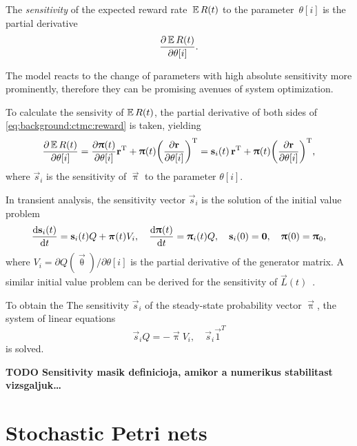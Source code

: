 \begin{dfn}
  The \emph{sensitivity} of the expected reward rate~$\operatorname{\mathbb{E}} R(t)$ to the
  parameter~$\theta[i]$ is the partial derivative
  \begin{equation}
    \frac{\partial \operatorname{\mathbb{E}} R(t)}{\partial \theta[i]} \text.
  \end{equation}
\end{dfn}

The model reacts to the change of parameters with high absolute
sensitivity more prominently, therefore they can be promising avenues
of system optimization.

To calculate the sensivity of $\operatorname{\mathbb{E}} R(t)$, the partial derivative of
both sides of \cref{eq:background:ctmc:reward} is taken, yielding
\begin{equation}
  \frac{\partial \Ex R(t)}{\partial \theta[i]} = \frac{\partial
    \vec{\uppi}(t)}{\partial \theta[i]} \vec{r}^\T + \vec{\uppi}(t)
  \mleft(\frac{\partial \vec{r}}{\partial \theta[i]}\mright)^\T =
  \vec{s}_i(t) \, \vec{r}^\T + \vec{\uppi}(t)
  \mleft(\frac{\partial \vec{r}}{\partial \theta[i]}\mright)^\T \text,
\end{equation}
where $\vec{s}_i$ is the sensitivity of $\vec{\uppi}$ to the parameter
$\theta[i]$.

In transient analysis, the sensitivity vector $\vec{s}_i$ is the
solution of the initial value problem
\begin{equation}
  \frac{\mathrm{d} \bm{\mathrm{s}}_i(t)}{\mathrm{d} t} = \bm{\mathrm{s}}_i(t) Q + \bm{\mathrm{\pi}}(t) V_i,
  \quad \frac{\mathrm{d} \bm{\mathrm{\uppi}}(t)}{\mathrm{d} t} = \bm{\mathrm{\uppi}}_i(t) Q,
  \quad \bm{\mathrm{s}}_i(0) = \bm{\mathrm{0}}, \quad \bm{\mathrm{\uppi}}(0) = \bm{\mathrm{\uppi}}_0
  \text,
\end{equation}
where $V_i = \partial Q(\vec{\uptheta}) / \partial \theta[i]$ is the
partial derivative of the generator matrix. A similar initial value
problem can be derived for the sensitivity of
$\vec{L}(t)$~\citep{DBLP:conf/sigmetrics/BlakeRT88}.

To obtain the The sensitivity $\vec{s}_i$ of the steady-state
probability vector $\vec{\uppi}$, the system of linear equations
\begin{equation}
  \vec{s}_i Q = -\vec{\uppi} V_i, \quad \vec{s}_i \vec{1}^T
\end{equation}
is solved.

\textbf{TODO Sensitivity masik definicioja, amikor a numerikus
  stabilitast vizsgaljuk\ldots}

\section{Stochastic Petri nets}


